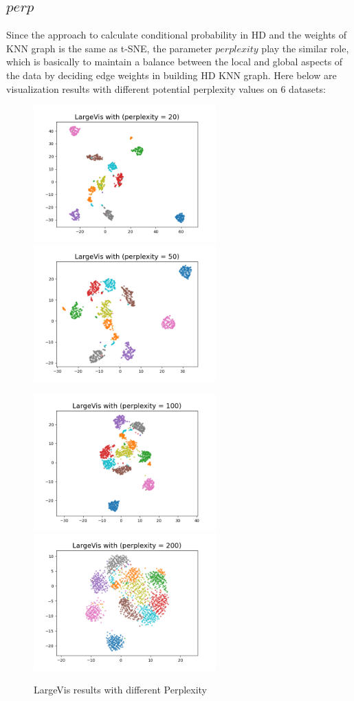 \subsection{$perp$}

Since the approach to calculate conditional probability in HD and the weights of KNN graph is the same as t-SNE, the parameter $perplexity$ play the similar role, which is basically to maintain a balance between the local and global aspects of the data by deciding edge weights in building HD KNN graph. Here below are visualization results with different potential perplexity values on 6 datasets:

\begin{figure}[H]
\centering  %
{
\label{Fig.sub.1}
\includegraphics[width=7cm,height=3.5cm\textwidth]{images/largevis/image_largevis_perp20.png}}
{
\label{Fig.sub.2}
\includegraphics[width=7cm,height=3.5cm\textwidth]{images/largevis/image_largevis_perp50.png}}

\centering  %
{
\label{Fig.sub.1}
\includegraphics[width=7cm,height=3.5cm\textwidth]{images/largevis/image_largevis_perp100.png}}
{
\label{Fig.sub.2}
\includegraphics[width=7cm,height=3.5cm\textwidth]{images/largevis/image_largevis_perp200.png}}
\caption{LargeVis results with different Perplexity}
\end{figure}

